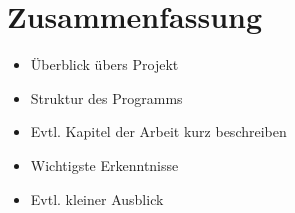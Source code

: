 

\chapter{Zusammenfassung}


\begin{itemize}
\item Überblick übers Projekt
\item Struktur des Programms
\item Evtl. Kapitel der Arbeit kurz beschreiben
\item Wichtigste Erkenntnisse
\item Evtl. kleiner Ausblick
\end{itemize}